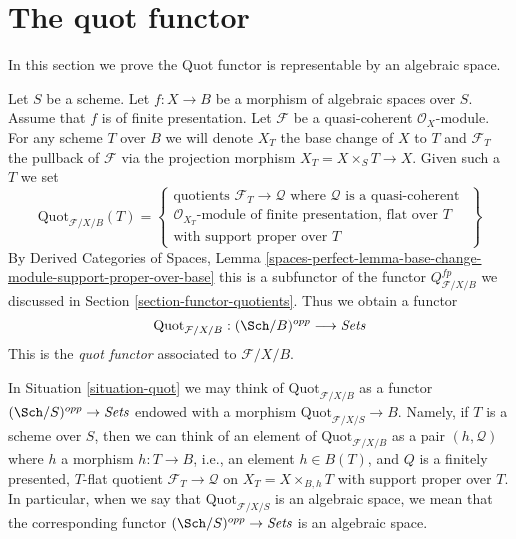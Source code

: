 \section{The quot functor}
\label{section-quot}

\noindent
In this section we prove the Quot functor is representable by
an algebraic space.

\begin{situation}
\label{situation-quot}
Let $S$ be a scheme. Let $f : X \to B$ be a morphism of
algebraic spaces over $S$. Assume that $f$ is of finite presentation.
Let $\mathcal{F}$ be a quasi-coherent $\mathcal{O}_X$-module.
For any scheme $T$ over $B$ we will denote $X_T$ the base change of
$X$ to $T$ and $\mathcal{F}_T$ the pullback
of $\mathcal{F}$ via the projection morphism $X_T = X \times_S T \to X$.
Given such a $T$ we set
$$
\text{Quot}_{\mathcal{F}/X/B}(T) =
\left\{
\begin{matrix}
\text{quotients }\mathcal{F}_T \to \mathcal{Q}\text{ where }
\mathcal{Q}\text{ is a quasi-coherent }\\
\mathcal{O}_{X_T}\text{-module of finite presentation, flat over }T\\
\text{with support proper over }T
\end{matrix}
\right\}
$$
By Derived Categories of Spaces, Lemma
\ref{spaces-perfect-lemma-base-change-module-support-proper-over-base}
this is a subfunctor of the functor $Q^{fp}_{\mathcal{F}/X/B}$
we discussed in Section \ref{section-functor-quotients}.
Thus we obtain a functor
\begin{equation}
\label{equation-quot}
\text{Quot}_{\mathcal{F}/X/B} : (\Sch/B)^{opp} \longrightarrow \textit{Sets}
\end{equation}
This is the {\it quot functor} associated to $\mathcal{F}/X/B$.
\end{situation}

\noindent
In Situation \ref{situation-quot} we may think of
$\text{Quot}_{\mathcal{F}/X/B}$ as a functor
$(\Sch/S)^{opp} \to \textit{Sets}$ endowed
with a morphism $\text{Quot}_{\mathcal{F}/X/S} \to B$.
Namely, if $T$ is a scheme over $S$, then we can think of an element
of $\text{Quot}_{\mathcal{F}/X/B}$ as a pair $(h, \mathcal{Q})$
where $h$ a morphism $h : T \to B$, i.e., an element $h \in B(T)$,
and $Q$ is a finitely presented, $T$-flat quotient
$\mathcal{F}_T \to \mathcal{Q}$ on $X_T = X \times_{B, h} T$
with support proper over $T$. In particular, when we say
that $\text{Quot}_{\mathcal{F}/X/S}$ is an algebraic space, we mean that the
corresponding functor $(\Sch/S)^{opp} \to \textit{Sets}$ is an algebraic space.

